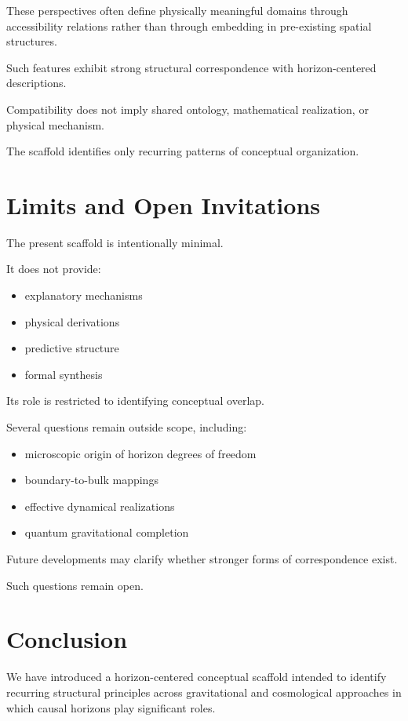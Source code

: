\documentclass[12pt,a4paper]{article}
\begin{document}
These perspectives often define physically meaningful domains through accessibility relations rather than through embedding in pre-existing spatial structures.

Such features exhibit strong structural correspondence with horizon-centered descriptions.

Compatibility does not imply shared ontology, mathematical realization, or physical mechanism.

The scaffold identifies only recurring patterns of conceptual organization.

\section{Limits and Open Invitations}

The present scaffold is intentionally minimal.

It does not provide:

\begin{itemize}
  \item explanatory mechanisms
  \item physical derivations
  \item predictive structure
  \item formal synthesis
\end{itemize}

Its role is restricted to identifying conceptual overlap.

Several questions remain outside scope, including:

\begin{itemize}
  \item microscopic origin of horizon degrees of freedom
  \item boundary-to-bulk mappings
  \item effective dynamical realizations
  \item quantum gravitational completion
\end{itemize}

Future developments may clarify whether stronger forms of correspondence exist.

Such questions remain open.

\section{Conclusion}

We have introduced a horizon-centered conceptual scaffold intended to identify recurring structural principles across gravitational and cosmological approaches in which causal horizons play significant roles.
\end{document}
